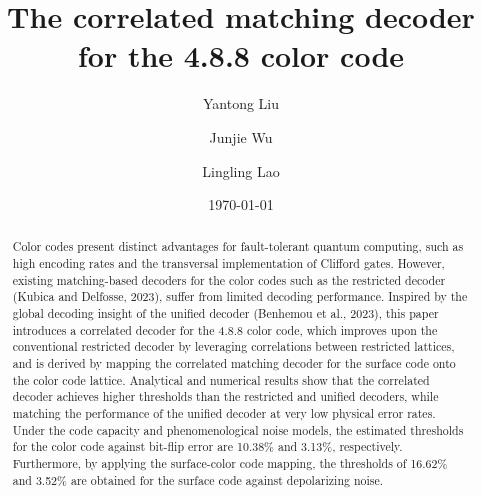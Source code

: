 \documentclass[%
 reprint,
 amsmath,amssymb,
 aps,
]{revtex4-2}
\begin{document}

\title{The correlated matching decoder for the 4.8.8 color code}%


\author{Yantong Liu}

\author{Junjie Wu}


\author{Lingling Lao}%
\date{\today}%

\begin{abstract}
Color codes present distinct advantages for fault-tolerant quantum computing, such as high encoding rates and the transversal implementation of Clifford gates.
However, existing matching-based decoders for the color codes such as the restricted decoder (Kubica and Delfosse, 2023), suffer from limited decoding performance. Inspired by the global decoding insight of the unified decoder (Benhemou et al., 2023), this paper introduces a correlated decoder for the 4.8.8 color code, which improves upon the conventional restricted decoder by leveraging correlations between restricted lattices, and is derived by mapping the correlated matching decoder for the surface code onto the color code lattice.
Analytical and numerical results show that the correlated decoder achieves  higher thresholds than the restricted and unified decoders, while matching the performance of the unified decoder at very low physical error rates.
Under the code capacity and phenomenological noise models, the estimated thresholds for the color code against bit-flip error are 10.38\% and 3.13\%, respectively. Furthermore, by applying the surface-color code mapping, the thresholds of 16.62\% and 3.52\% are obtained for the surface code against depolarizing noise. 

\end{abstract}
\end{document}
